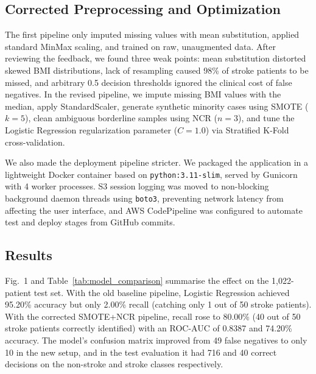 \documentclass[10pt,twocolumn,a4paper]{article}
\begin{document}
\subsection{Corrected Preprocessing and Optimization}
The first pipeline only imputed missing values with mean substitution, applied standard MinMax scaling, and trained on raw, unaugmented data. After reviewing the feedback, we found three weak points: mean substitution distorted skewed BMI distributions, lack of resampling caused 98\% of stroke patients to be missed, and arbitrary 0.5 decision thresholds ignored the clinical cost of false negatives. In the revised pipeline, we impute missing BMI values with the median, apply StandardScaler, generate synthetic minority cases using SMOTE ($k=5$), clean ambiguous borderline samples using NCR ($n=3$), and tune the Logistic Regression regularization parameter ($C=1.0$) via Stratified K-Fold cross-validation.

We also made the deployment pipeline stricter. We packaged the application in a lightweight Docker container based on \texttt{python:3.11-slim}, served by Gunicorn with 4 worker processes. S3 session logging was moved to non-blocking background daemon threads using \texttt{boto3}, preventing network latency from affecting the user interface, and AWS CodePipeline was configured to automate test and deploy stages from GitHub commits.

\subsection{Results}
Fig.~1 and Table~\ref{tab:model_comparison} summarise the effect on the 1,022-patient test set. With the old baseline pipeline, Logistic Regression achieved 95.20\% accuracy but only 2.00\% recall (catching only 1 out of 50 stroke patients). With the corrected SMOTE+NCR pipeline, recall rose to 80.00\% (40 out of 50 stroke patients correctly identified) with an ROC-AUC of 0.8387 and 74.20\% accuracy. The model's confusion matrix improved from 49 false negatives to only 10 in the new setup, and in the test evaluation it had 716 and 40 correct decisions on the non-stroke and stroke classes respectively.
\end{document}
